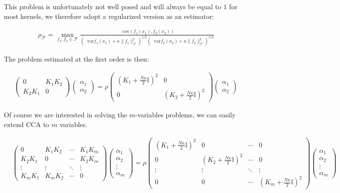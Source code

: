 \documentclass[a4paper,BCOR=5mm,oneside,openany]{scrreprt}
\newcommand*\cov{\mathop{}\!\mathrm{cov}}
\newcommand*\var{\mathop{}\!\mathrm{var}}
\begin{document}
This problem is unfortunately not well posed and will always be equal to $1$ for most kernels, we therefore adopt a regularized version as an estimator:

\begin{align*}
	\rho_\mathcal{F} = \max_{f_1, f_2 \in \mathcal{F}} \frac{\cov (f_1(x_1), f_2 (x_2))}{(\var f_1 (x_1) + \kappa \lVert f_1 \rVert^2 _\mathcal{F} )^{1/2} (\var f_2 (x_2) + \kappa \lVert f_2 \rVert^2 _\mathcal{F} )^{1/2}}
\end{align*}

The problem estimated at the first order is then:

\begin{align*}
	\begin{pmatrix}
		0 & K_1 K_2 \\
		K_2 K_1 & 0
	\end{pmatrix} \begin{pmatrix}
		\alpha_1 \\ \alpha_2
	\end{pmatrix}
	= \rho \begin{pmatrix}
		(K_1+\frac{N \kappa}{2} \mathbb{I})^2 & 0 \\
		0 & (K_2+\frac{N \kappa}{2} \mathbb{I})^2
	\end{pmatrix} \begin{pmatrix}
		\alpha_1 \\ \alpha_2
	\end{pmatrix}
\end{align*}

Of course we are interested in solving the $m$-variables problems, we can easily extend CCA to $m$ variables.

\begin{align*}
	&\begin{pmatrix}
		0 & K_1 K_2  & \cdots & K_1 K_m\\
		K_2 K_1 & 0 & \cdots & K_2 K_m \\
		\vdots & \vdots & \ddots & \vdots \\
		K_m K_1 & K_m K_2 & \cdots & 0
	\end{pmatrix} \begin{pmatrix}
		\alpha_1 \\ \alpha_2 \\ \vdots \\ \alpha_m
	\end{pmatrix} = \rho \begin{pmatrix}
		(K_1+\frac{N \kappa}{2} \mathbb{I})^2 & 0  & \cdots & 0\\
		0 & (K_2+\frac{N \kappa}{2} \mathbb{I})^2 & \cdots & 0 \\
		\vdots & \vdots & \ddots & \vdots \\
		0 & 0 & \cdots & (K_m+\frac{N \kappa}{2} \mathbb{I})^2
	\end{pmatrix} \begin{pmatrix}
		\alpha_1 \\ \alpha_2 \\ \vdots \\ \alpha_m
	\end{pmatrix}
\end{align*}
\end{document}
